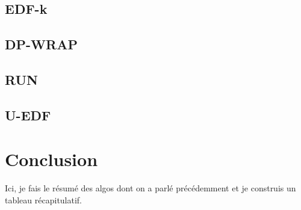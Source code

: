 \documentclass[11pt,a4paper,oneside]{report}
\begin{document}
\subsection{EDF-k}
\subsection{DP-WRAP}
\subsection{RUN}
\subsection{U-EDF}


\section{Conclusion}

Ici, je fais le résumé des algos dont on a parlé précédemment et je construis un tableau récapitulatif. 



\end{document}
